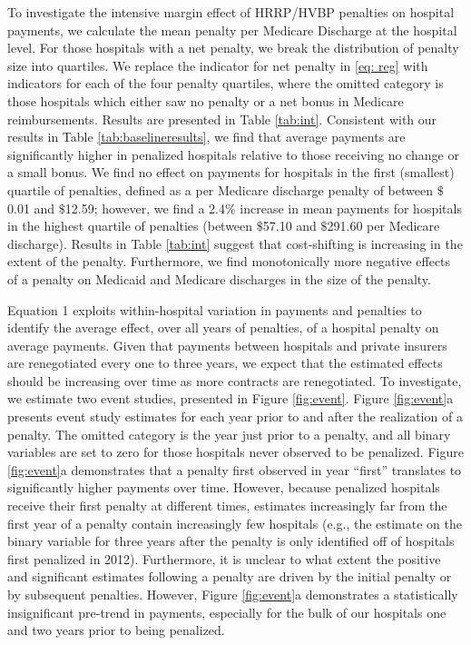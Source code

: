 \documentclass[12pt]{article}
\begin{document}
To investigate the intensive margin effect of HRRP/HVBP penalties on hospital payments, we calculate the mean penalty per Medicare Discharge at the hospital level.  For those hospitals with a net penalty, we break the distribution of penalty size into quartiles.  We replace the indicator for net penalty in \ref{eq: reg} with indicators for each of the four penalty quartiles, where the omitted category is those hospitals which either saw no penalty or a net bonus in Medicare reimbursements. Results are presented in Table \ref{tab:int}.  Consistent with our results in Table \ref{tab:baselineresults}, we find that average payments are significantly higher in penalized hospitals relative to those receiving no change or a small bonus.  We find no effect on payments for hospitals in the first (smallest) quartile of penalties, defined as a per Medicare discharge penalty of between $\$$0.01 and $\$$12.59; however, we find a 2.4$\%$ increase in mean payments for hospitals in the highest quartile of penalties (between $\$$57.10 and $\$$291.60 per Medicare discharge).  Results in Table \ref{tab:int} suggest that cost-shifting is increasing in the extent of the penalty.  Furthermore, we find monotonically more negative effects of a penalty on Medicaid and Medicare discharges in the size of the penalty.


Equation 1 exploits within-hospital variation in payments and penalties to identify the average effect, over all years of penalties, of a hospital penalty on average payments.  Given that payments between hospitals and private insurers are renegotiated every one to three years, we expect that the estimated effects should be increasing over time as more contracts are renegotiated.  To investigate, we estimate two event studies, presented in Figure \ref{fig:event}.  Figure \ref{fig:event}a presents event study estimates for each year prior to and after the realization of a penalty.  The omitted category is the year just prior to a penalty, and all binary variables are set to zero for those hospitals never observed to be penalized.  Figure \ref{fig:event}a demonstrates that a penalty first observed in year ``first'' translates to significantly higher payments over time.  However, because penalized hospitals receive their first penalty at different times, estimates increasingly far from the first year of a penalty contain increasingly few hospitals (e.g., the estimate on the binary variable for three years after the penalty is only identified off of hospitals first penalized in 2012).  Furthermore, it is unclear to what extent the positive and significant estimates following a penalty are driven by the initial penalty or by subsequent penalties.  However, Figure \ref{fig:event}a demonstrates a statistically insignificant pre-trend in payments, especially for the bulk of our hospitals one and two years prior to being penalized.
\end{document}
